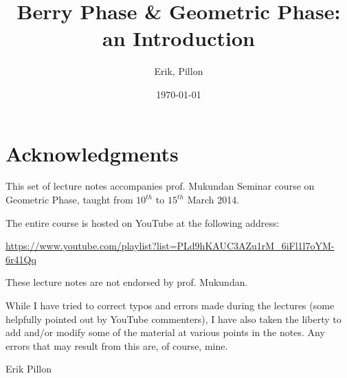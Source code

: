 \documentclass[12pt,parskip=half, DIV=calc, BCOR=10mm, x11names]{scrbook}
\title{Berry Phase \& Geometric Phase: an Introduction}
\date{\today}
\author{Erik, Pillon}
\theoremstyle{remark}
\begin{document}
\maketitle
\frontmatter


\section*{Acknowledgments}
This set of lecture notes accompanies prof. Mukundan Seminar course on Geometric Phase, taught from $ 10^{th} $ to $ 15^{th} $ March 2014.

The entire course is hosted on YouTube at the following address:
{\scriptsize \begin{center}
	\url{https://www.youtube.com/playlist?list=PLd9hKAUC3AZu1rM_6iFl1l7oYM-6r41Qq}
\end{center}}
These lecture notes are not endorsed by prof. Mukundan.

While I have tried to correct typos and errors made during the lectures (some helpfully pointed out by YouTube commenters), I have also taken the liberty to add and/or modify some of the material at various points in the notes. Any errors that may result from this are, of course, mine.


\hfill {\ECFJD \Large Erik Pillon ~~~}
\tableofcontents

\mainmatter








%
%
\backmatter

%

\end{document}
